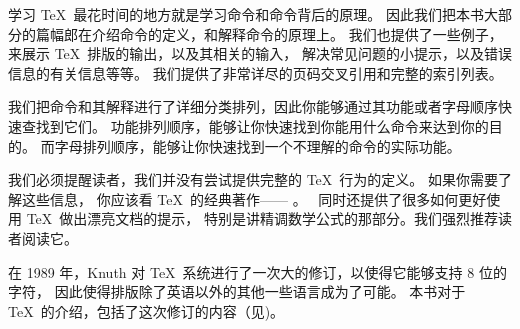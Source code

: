 学习 \TeX\ 最花时间的地方就是学习命令和命令背后的原理。
因此我们把本书大部分的篇幅郎在介绍命令的定义，和解释命令的原理上。
我们也提供了一些例子，来展示 \TeX\ 排版的输出，以及其相关的输入，
解决常见问题的小提示，以及错误信息的有关信息等等。
我们提供了非常详尽的页码交叉引用和完整的索引列表。

我们把命令和其解释进行了详细分类排列，因此你能够通过其功能或者字母顺序快速查找到它们。
功能排列顺序，能够让你快速找到你能用什么命令来达到你的目的。
而字母排列顺序，能够让你快速找到一个不理解的命令的实际功能。

我们必须提醒读者，我们并没有尝试提供完整的 \TeX\ 行为的定义。
如果你需要了解这些信息， 你应该看 \TeX\ 的经典著作—— \texbook{}。
\texbook\ 同时还提供了很多如何更好使用 \TeX\ 做出漂亮文档的提示，
特别是讲精调数学公式的那部分。我们强烈推荐读者阅读它。

在 1989 年，Knuth 对 \TeX\ 系统进行了一次大的修订，以使得它能够支持 $8$ 位的字符，
因此使得排版除了英语以外的其他一些语言成为了可能。
本书对于 \TeX\ 的介绍，包括了这次修订的内容（见)。

